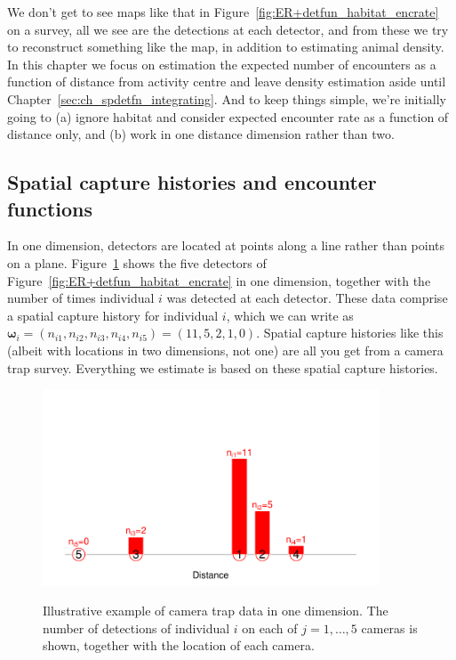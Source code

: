 \documentclass[graybox,envcountchap,sectrefs]{SpringerStyleFiles/styles/svmono}\usepackage[]{graphicx}\usepackage[]{color}
\begin{document}
We don't get to see maps like that in Figure~\ref{fig:ER+detfun_habitat_encrate} on a survey, all we see are the detections at each detector, and from these we try to reconstruct something like the map, in addition to estimating animal density. In this chapter we focus on estimation the expected number of encounters as a function of distance from activity centre and leave density estimation aside until Chapter~\ref{sec:ch_spdetfn_integrating}. And to keep things simple, we're initially going to (a) ignore habitat and consider expected encounter rate as a function of distance only, and (b) work in one distance dimension rather than two. 

\subsection{Spatial capture histories and encounter functions}
\label{subsec:ER+detfun.spatialCH}

In one dimension, detectors are located at points along a line rather than points on a plane. Figure~\ref{fig:ER+detfun_enc} shows the five detectors of Figure~\ref{fig:ER+detfun_habitat_encrate} in one dimension, together with the number of times individual $i$ was detected at each detector. These data comprise a spatial capture history for individual $i$, which we can write as $\bm{\omega}_i=(n_{i1},n_{i2},n_{i3},n_{i4},n_{i5})=(11,5,2,1,0)$. Spatial capture histories like this (albeit with locations in two dimensions, not one) are all you get from a camera trap survey. Everything we estimate is based on these spatial capture histories.


\begin{figure}[ht]
\caption{\small Illustrative example of camera trap data in one dimension. The number of detections of individual $i$ on each of $j=1,\ldots,5$ cameras is shown, together with the location of each camera.}
\centering
\vspace{-24pt}
\includegraphics[width=10cm]{keepfigure/ObsN.pdf}
\label{fig:ER+detfun_enc}
\end{figure}
\end{document}
